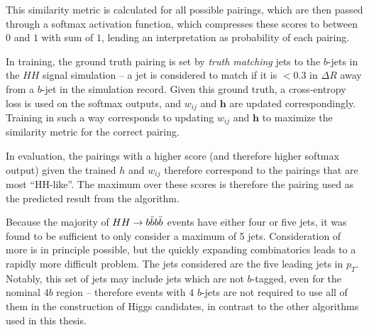 This similarity metric is calculated for all possible pairings, which are then passed through a 
softmax  activation function, which compresses these scores to between $0$ and $1$ 
with sum of $1$, lending an interpretation as probability of each pairing.

In training, the ground truth pairing is set by \emph{truth matching} jets to the $b$-jets 
in the $HH$ signal simulation -- a jet is considered to match if it is $< 0.3$ in $\Delta R$
away from a $b$-jet in the simulation record. Given this ground truth, a cross-entropy loss 
is used on the softmax outputs, and $w_{ij}$ and $\mathbf{h}$ are updated correspondingly.
Training in such a way corresponds to updating $w_{ij}$ and $\mathbf{h}$ to maximize the similarity 
metric for the correct pairing.

In evaluation, the pairings with a higher score (and therefore higher softmax output) given 
the trained $h$ and $w_{ij}$ therefore correspond to the pairings that are most ``HH-like''. 
The maximum over these scores is therefore the pairing used as the predicted result from 
the algorithm.

Because the majority of $HH\rightarrow b\bar{b}b\bar{b}$ events have either four or five jets, it was 
found to be sufficient to only consider a maximum of 5 jets. Consideration of more is in 
principle possible, but the quickly expanding combinatorics leads to a rapidly more 
difficult problem. The jets considered are the five leading jets in $p_{T}$. Notably, 
this set of jets may include jets which are not $b$-tagged, even for the nominal $4b$ 
region -- therefore events with $4$ $b$-jets are not required to use all of them 
in the construction of Higgs candidates, in contrast to the other algorithms used in this 
thesis.

